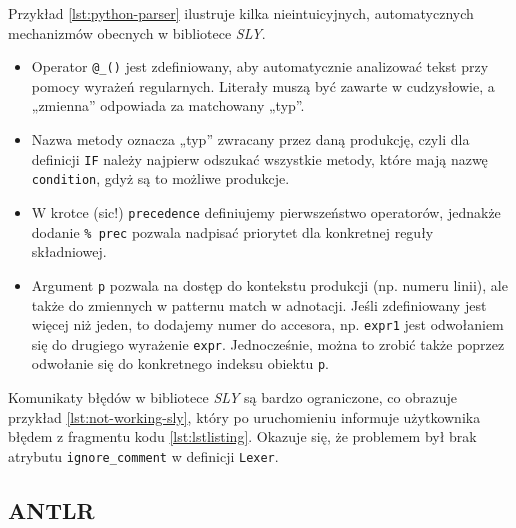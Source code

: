 Przykład \ref{lst:python-parser} ilustruje kilka nieintuicyjnych, automatycznych mechanizmów obecnych w bibliotece \textit{SLY}.
\begin{itemize}
    \item Operator \verb|@_()| jest zdefiniowany, aby automatycznie analizować tekst przy pomocy wyrażeń regularnych.
    Literały muszą być zawarte w cudzysłowie, a „zmienna” odpowiada za matchowany „typ”.
    \item Nazwa metody oznacza „typ” zwracany przez daną produkcję, czyli dla definicji \verb|IF| należy najpierw odszukać wszystkie metody, które mają nazwę \verb|condition|, gdyż są to możliwe produkcje.
    \item W krotce (sic!) \verb|precedence| definiujemy pierwszeństwo operatorów, jednakże dodanie \verb|% prec| pozwala nadpisać priorytet dla konkretnej reguły składniowej.
    \item  Argument \verb|p| pozwala na dostęp do kontekstu produkcji (np. numeru linii), ale także do zmiennych w patternu match w adnotacji.
    Jeśli zdefiniowany jest więcej niż jeden, to dodajemy numer do accesora, np. \verb|expr1| jest odwołaniem się do drugiego wyrażenie \verb|expr|.
    Jednocześnie, można to zrobić także poprzez odwołanie się do konkretnego indeksu obiektu \verb|p|.
\end{itemize}



Komunikaty błędów w bibliotece \textit{SLY} są bardzo ograniczone, co obrazuje przykład \ref{lst:not-working-sly}, który po uruchomieniu informuje użytkownika błędem z fragmentu kodu \ref{lst:lstlisting}.
Okazuje się, że problemem był brak atrybutu \verb|ignore_comment| w definicji \verb|Lexer|.




\subsection{ANTLR}
\label{subsec:antlr}

